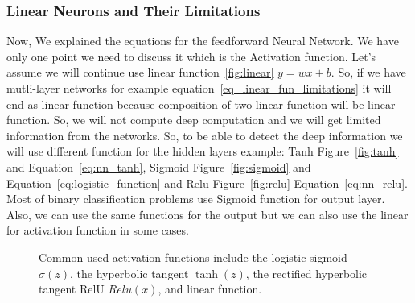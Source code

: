 \newpage
\subsubsection{Linear Neurons and Their Limitations}

Now, We explained the equations for the feedforward Neural Network. We have only one point we need to discuss it which is the Activation function. Let's assume we will continue use linear function~\ref{fig:linear} $y= w x + b$. So, if we have mutli-layer networks for example equation~\eqref{eq_linear_fun_limitations} it will end as linear function because composition of two linear function will be linear function. So, we will not compute deep computation and we will get limited information from the networks. So, to be able to detect the deep information we will use different function for the hidden layers example: Tanh Figure~\ref{fig:tanh} and Equation~\eqref{eq:nn_tanh}, Sigmoid Figure~\ref{fig:sigmoid} and  Equation~\eqref{eq:logistic_function} and Relu Figure~\ref{fig:relu} Equation~\eqref{eq:nn_relu}. Most of binary classification problems use Sigmoid function for output layer. Also, we can use the same functions for the output but we can also use the linear for activation function in some cases.



\begin{figure}[ht!]
  \centering
%
%          
%
          \caption{Common used activation functions include the logistic sigmoid $\sigma(z)$, the hyperbolic tangent $\tanh(z)$, the rectified hyperbolic tangent RelU $Relu(x)$, and linear function.}

\end{figure}

